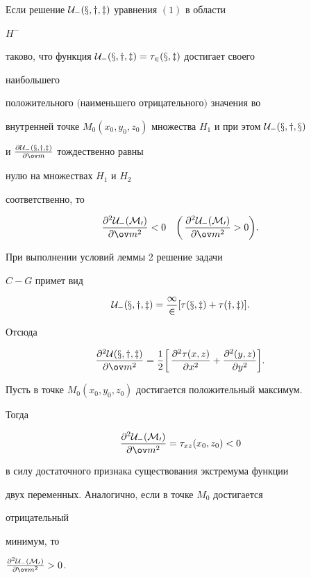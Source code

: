  


\begin{lem} Если решение $\cal U_-(x,y,z)$ уравнения $(1)$ в области 


$H^-$ 


таково, что функция $\cal U_-(x,y,z)=\tau_2(x,z)$ достигает своего 


наибольшего 


положительного $($наименьшего от\-ри\-ца\-тель\-но\-го$)$ значения во 


внутренней точке $M_0(x_0,y_0,z_0)$ множества $H_1$ и при этом $\cal 


U_-(x,y,x)$ 


и $\frac{\partial\cal U_-(x,y,z)}{\partial\ov m}$ тождественно равны 


нулю на множествах $H_1$ и $H_2$ 


соответственно, то 


$$ 


\frac{\partial^2\cal U_-(M_0)}{\partial\ov m^2}<0\quad 


\bigg(\,\frac{\partial^2\cal U_-(M_0)}{\partial\ov m^2}>0 


\bigg).


$$ 


\end{lem} 


 


\begin{pf} При выполнении условий леммы 2 решение задачи  


$C-G$ примет вид 


$$ 


\cal U_-(x,y,z)=\frac{1}{2}[\tau(x,z)+\tau(y,z)]. 


$$ 


Отсюда 


$$


\frac{\partial^2\cal U(x,y,z)}{\partial\ov m^2}=\frac{1}{2} 


\bigg[\,\frac{\partial^2\tau(x,z)}{\partial x^2}+ 


\frac{\partial^2(y,z)}{\partial y^2}\bigg]. 


$$


Пусть в точке $M_0(x_0,y_0,z_0)$ достигается положительный максимум. 


Тогда 


$$ 


\frac{\partial^2\cal U_-(M_0)}{\partial\ov m^2}= 


\tau_{xz}(x_0,z_0)<0 


$$ 


в силу достаточного признака существования экстремума функции  


двух переменных. Аналогично, если в точке $M_0$ достигается 


отрицательный 


минимум, то 


$\frac{\partial^2\cal U_-(M_0)}{\partial\ov m^2}>0$. 


\end{pf} 


